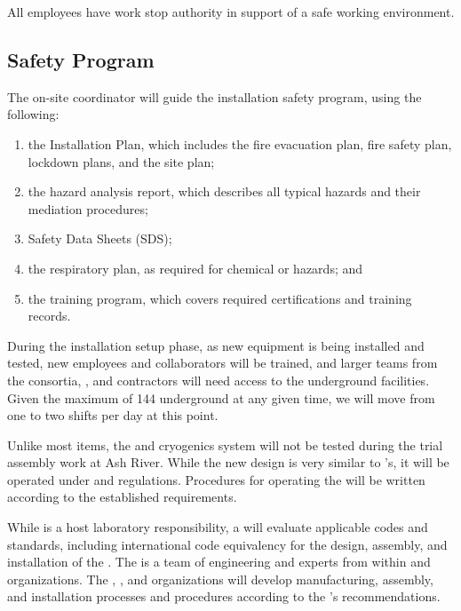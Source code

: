 All employees have work stop authority in support of  a safe working environment. 

\subsection{Safety Program}

The on-site  coordinator will guide the  installation safety program, using the following:

\begin{enumerate}
\item	the  Installation  Plan, which includes the fire evacuation plan, fire safety plan, lockdown plans, and the site plan;
\item	the hazard analysis report, which describes all typical hazards and their mediation procedures; 
\item	Safety Data Sheets (SDS); 
\item	the respiratory plan, as required for chemical or  hazards; and 
\item	the training program, which covers required certifications and  training records.
\end{enumerate}


During the installation setup phase, as new equipment is being installed and tested, new employees and collaborators will be trained, and larger teams from the consortia, ,  and contractors will need access to the underground facilities.  Given the maximum of 144  underground at any given time, we will move from one to two shifts per day at this point. 


Unlike most items, the \coldbox and cryogenics system will not be %
tested during the trial assembly work at Ash River. 
While the new \coldbox design is very similar to 's, it will be operated under  and  regulations.  Procedures for operating the \coldbox will be written according to the established requirements.



While  is  a host laboratory responsibility, a   will evaluate applicable codes and standards, including international code equivalency for the design, assembly, and installation of the  . The  is a team of engineering and  experts from within  and  organizations.  The , , and  organizations will develop manufacturing, assembly, and installation processes and procedures according to the 's recommendations. 

